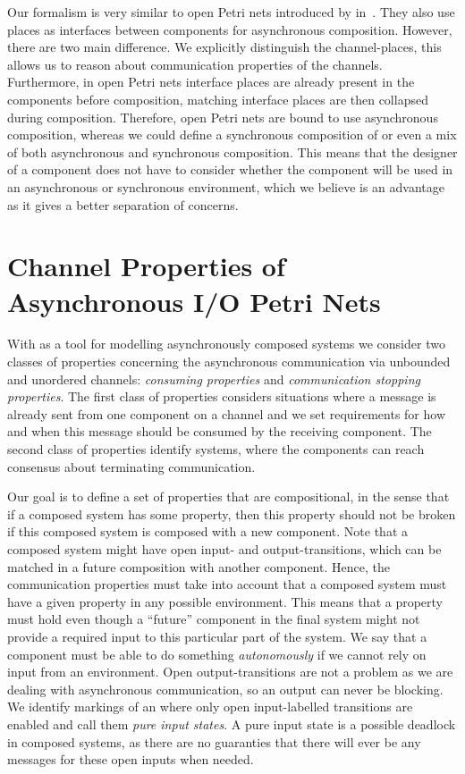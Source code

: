 Our \AIOPN formalism is very similar to open Petri nets introduced by \citeauthor{openPN} in~\cite{openPN}. They also use places as interfaces between components for asynchronous composition. However, there are two main difference. We explicitly distinguish the channel-places, this allows us to reason about communication properties of the channels. Furthermore, in open Petri nets interface places are already present in the components before composition, matching interface places are then collapsed during composition. Therefore, open Petri nets are bound to use asynchronous composition, whereas we could define a synchronous composition of \AIOPNs or even a mix of both asynchronous and synchronous composition. This means that the designer of a component does not have to consider whether the component will be used in an asynchronous or synchronous environment, which we believe is an advantage as it gives a better separation of concerns.

\section{Channel Properties of Asynchronous I/O Petri Nets}
With \AIOPN as a tool for modelling asynchronously composed systems we consider two classes of properties concerning the asynchronous communication via unbounded and unordered channels: \emph{consuming properties} and \emph{communication stopping properties}. The first class of properties considers situations where a message is already sent from one component on a channel and we set requirements for how and when this message should be consumed by the receiving component. The second class of properties identify systems, where the components can reach consensus about terminating communication. 

Our goal is to define a set of properties that are compositional, in the sense that if a composed system has some property, then this property should not be broken if this composed system is composed with a new component. Note that a composed system might have open input- and output-transitions, which can be matched in a future composition with another component. Hence, the communication properties must take into account that a composed system must have a given property in any possible environment. This means that a property must hold even though a ``future'' component in the final system might not provide a required input to this particular part of the system. We say that a component must be able to do something \emph{autonomously} if we cannot rely on input from an environment. Open output-transitions are not a problem as we are dealing with asynchronous communication, so an output can never be blocking. We identify markings of an \AIOPN where only open input-labelled transitions are enabled and call them \emph{pure input states}. A pure input state is a possible deadlock in composed systems, as there are no guaranties that there will ever be any messages for these open inputs when needed. 

